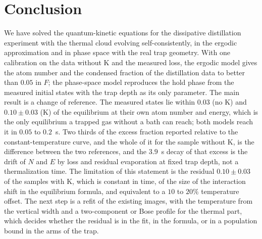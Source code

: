 \section{Conclusion}
We have solved the quantum-kinetic equations for the dissipative
distillation experiment with the thermal cloud evolving self-consistently,
in the ergodic approximation and in phase space with the real trap
geometry. With one calibration on the data without K and the measured loss,
the ergodic model gives the atom number and the condensed fraction of the
distillation data to better than $0.05$ in $F$; the phase-space model
reproduces the hold phase from the measured initial states with the trap
depth as its only parameter. The main result is a change of reference. The
measured states lie within $0.03$ (no K) and $0.10\pm0.03$ (K) of the
equilibrium at their own atom number and energy, which is the only
equilibrium a trapped gas without a bath can reach; both models reach it in
$0.05$ to $0.2$~s. Two thirds of the excess fraction reported relative to
the constant-temperature curve, and the whole of it for the sample without
K, is the difference between the two references, and the $3.9$~s decay of
that excess is the drift of $N$ and $E$ by loss and residual evaporation at
fixed trap depth, not a thermalization time. The limitation of this
statement is the residual $0.10\pm0.03$ of the samples with K, which is
constant in time, of the size of the interaction shift in the equilibrium
formula, and equivalent to a $10$ to $20\%$ temperature offset. The next
step is a refit of the existing images, with the temperature from the
vertical width and a two-component or Bose profile for the thermal part,
which decides whether the residual is in the fit, in the formula, or in a
population bound in the arms of the trap.
